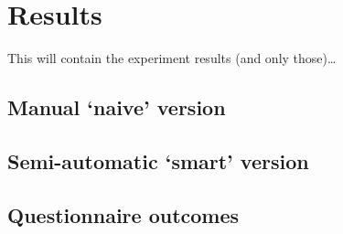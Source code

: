 \chapter{Results}

This will contain the experiment results (and only those)\ldots

\nlipsum


\section{Manual `naive' version}
\nlipsum


\section{Semi-automatic `smart' version}
\nlipsum


\section{Questionnaire outcomes}
\nlipsum

